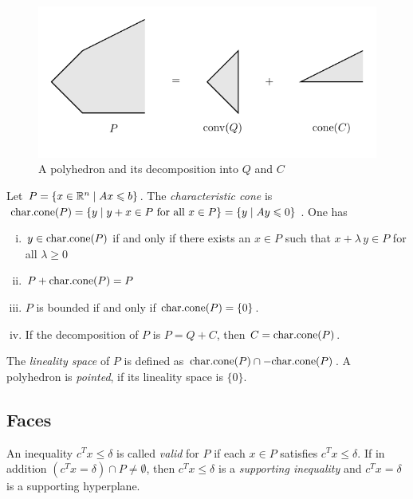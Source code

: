 \begin{figure}[htbp]
  \begin{center}
    \includegraphics{figures/PicPolyhedra1.pdf}
  \end{center}
  \caption{A polyhedron and its decomposition into $Q$ and $C$\label{po:fig:decomp}}
\end{figure}




Let $P = \{ x \in \mathbb{R}^n \mid Ax\leqslant b\}$. The \emph{characteristic cone} is 
$\mathrm{char.cone}(P) =\{ y \mid y+x \in P \text{ for all } x \in P\} = \{y \mid Ay
\leqslant0\}$. One has
\begin{enumerate}[i)]
\item $y \in \mathrm{char.cone}(P)$ if and only if there exists an $x \in P$ such
  that $x + \lambda\,y \in P$ for all $\lambda\geq0$ 
\item $P + \mathrm{char.cone}(P)=P$
\item $P$ is bounded if and only if $\mathrm{char.cone}(P)=\{0\}$. 
\item If the decomposition of $P$ is $P = Q +C$, then $C = \mathrm{char.cone}(P)$. 
\end{enumerate}



The \emph{lineality space} of $P$ is defined as $\mathrm{char.cone}(P) \cap -
\mathrm{char.cone}(P)$. A polyhedron is \emph{pointed}, if its lineality space is
$\{0\}$.






\subsection{Faces}
\label{po:sec:faces}

An inequality $c^Tx\leq\delta$    is called \emph{valid} for $P$ if each $x
\in P$ satisfies $c^Tx\leq\delta$. If in addition $(c^Tx = \delta) \cap P \neq\emptyset$,
then $c^Tx\leq\delta$ is a \emph{supporting inequality} and $c^Tx = \delta$ is a
supporting hyperplane. 

